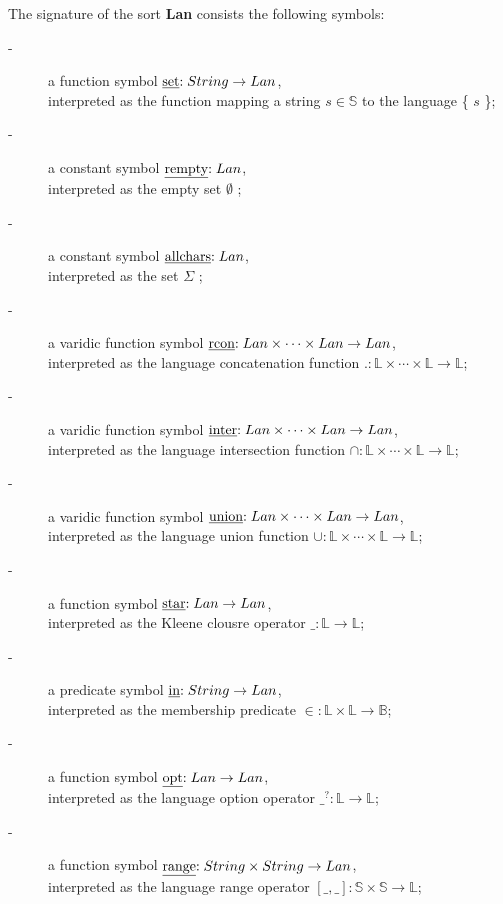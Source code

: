 The signature of the sort  \textbf{Lan} consists the following symbols:

\begin{description}
	\item[-] a function symbol \($\underline{set}$ : String  \to Lan \), \\interpreted as the function mapping a string \( s \in \mathbb S \) to the language \{ \(s\) \};
	\item[-] a constant symbol \( $\underline{rempty}$: Lan\),\\ interpreted as the empty set \(\emptyset\) ;
	\item[-] a constant symbol \( $\underline{allchars}$: Lan\),\\ interpreted as the set \(\Sigma\) ;
	\item[-] a varidic function symbol \($\underline{rcon}$ : Lan \times \cdots \times Lan \to Lan\),\\ interpreted as the language concatenation function \(. : \mathbb L \times \cdots \times \mathbb L \to \mathbb L\);	
	\item[-] a varidic function symbol \($\underline{inter}$ : Lan \times \cdots \times Lan \to Lan\), \\interpreted as the language intersection function \( \cap : \mathbb L \times \cdots \times \mathbb L \to \mathbb L\);
	\item[-] a varidic function symbol \($\underline{union}$ : Lan \times \cdots \times Lan \to Lan\), \\interpreted as the language union function \( \cup : \mathbb L \times \cdots \times \mathbb L \to \mathbb L\);
	\item[-] a function symbol \($\underline{star}$ : Lan \to Lan\), \\interpreted as the Kleene clousre operator \( \_ : \mathbb L \to \mathbb L\);
	\item[-] a predicate symbol \($\underline{in}$ : String \to Lan\),\\ interpreted as the membership predicate  \( \in: \mathbb L  \times \mathbb L \to \mathbb B\);
	\item[-] a function symbol \($\underline{opt}$ : Lan \to Lan\), \\interpreted as the language option operator \( \_^? : \mathbb L \to \mathbb L\);
	\item[-] a function symbol \($\underline{range}$ : String \times String \to Lan\), \\interpreted as the language range operator \(  [\_,\_] : \mathbb S \times \mathbb S \to \mathbb L\);
	

\end{description}
